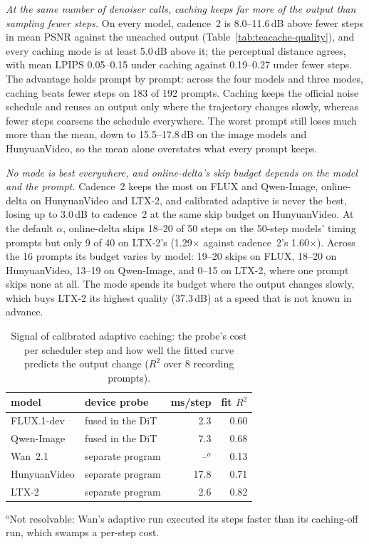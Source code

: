 \emph{At the same number of denoiser calls, caching keeps far more of the output than sampling fewer steps.} On every model, cadence~2 is 8.0--11.6\,dB above fewer steps in mean PSNR against the uncached output (Table~\ref{tab:teacache-quality}), and every caching mode is at least 5.0\,dB above it; the perceptual distance agrees, with mean LPIPS 0.05--0.15 under caching against 0.19--0.27 under fewer steps. The advantage holds prompt by prompt: across the four models and three modes, caching beats fewer steps on 183 of 192 prompts. Caching keeps the official noise schedule and reuses an output only where the trajectory changes slowly, whereas fewer steps coarsens the schedule everywhere. The worst prompt still loses much more than the mean, down to 15.5--17.8\,dB on the image models and HunyuanVideo, so the mean alone overstates what every prompt keeps.

\emph{No mode is best everywhere, and online-delta's skip budget depends on the model and the prompt.} Cadence~2 keeps the most on FLUX and Qwen-Image, online-delta on HunyuanVideo and LTX-2, and calibrated adaptive is never the best, losing up to 3.0\,dB to cadence~2 at the same skip budget on HunyuanVideo. At the default $\alpha$, online-delta skips 18--20 of 50 steps on the 50-step models' timing prompts but only 9 of 40 on LTX-2's (1.29$\times$ against cadence~2's 1.60$\times$). Across the 16 prompts its budget varies by model: 19--20 skips on FLUX, 18--20 on HunyuanVideo, 13--19 on Qwen-Image, and 0--15 on LTX-2, where one prompt skips none at all. The mode spends its budget where the output changes slowly, which buys LTX-2 its highest quality (37.3\,dB) at a speed that is not known in advance.

\begin{table}[t]
\caption{Signal of calibrated adaptive caching: the probe's cost per scheduler step and how well the fitted curve predicts the output change ($R^2$ over 8 recording prompts).}
\label{tab:cache-boundary}
\centering
\footnotesize
\setlength{\tabcolsep}{4pt}
\begin{tabular}{@{}llrr@{}}
\toprule
model & device probe & ms/step & fit $R^2$ \\
\midrule
FLUX.1-dev   & fused in the DiT  & 2.3  & 0.60 \\
Qwen-Image   & fused in the DiT  & 7.3  & 0.68 \\
Wan~2.1      & separate program  & --$^{o}$ & 0.13 \\
HunyuanVideo & separate program  & 17.8 & 0.71 \\
LTX-2        & separate program  & 2.6  & 0.82 \\
\bottomrule
\end{tabular}
\par\smallskip
{\raggedright\scriptsize $^{o}$Not resolvable: Wan's adaptive run executed its steps faster than its caching-off run, which swamps a per-step cost.\par}
\vskip -0.1in
\end{table}

